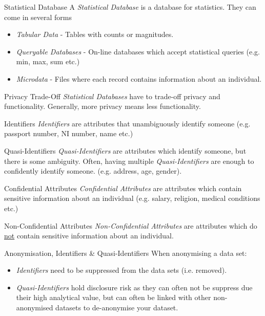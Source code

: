 \documentclass[11pt,a4paper]{article}
\begin{document}
  \begin{definition}{Statistical Database}
    A \textit{Statistical Database} is a database for statistics. They can come in several forms
    \begin{itemize}
      \item \textit{Tabular Data} - Tables with counts or magnitudes.
      \item \textit{Queryable Databases} - On-line databases which accept statistical queries (e.g. min, max, sum etc.)
      \item \textit{Microdata} - Files where each record contains information about an individual.
    \end{itemize}
  \end{definition}

  \begin{remark}{Privacy Trade-Off}
    \textit{Statistical Databases} have to trade-off privacy and functionality. Generally, more privacy means less functionality.
  \end{remark}

  \begin{definition}{Identifiers}
    \textit{Identifiers} are attributes that unambiguously identify someone (e.g. passport number, NI number, name etc.)
  \end{definition}

  \begin{definition}{Quasi-Identifiers}
    \textit{Quasi-Identifiers} are attributes which identify someone, but there is some ambiguity. Often, having multiple \textit{Quasi-Identifiers} are enough to confidently identify someone. (e.g. address, age, gender).
  \end{definition}

  \begin{definition}{Confidential Attributes}
    \textit{Confidential Attributes} are attributes which contain sensitive information about an individual (e.g. salary, religion, medical conditions etc.)
  \end{definition}

  \begin{definition}{Non-Confidential Attributes}
    \textit{Non-Confidential Attributes} are attributes which do \underline{not} contain sensitive information about an individual.
  \end{definition}

  \begin{remark}{Anonymisation, Identifiers \& Quasi-Identifiers}
    When anonymising a data set:
    \begin{itemize}
      \item \textit{Identifiers} need to be suppressed from the data sets (i.e. removed).
      \item \textit{Quasi-Identifiers} hold disclosure risk as they can often not be suppress due their high analytical value, but can often be linked with other non-anonymised datasets to de-anonymise your dataset.
    \end{itemize}
  \end{remark}
\end{document}
